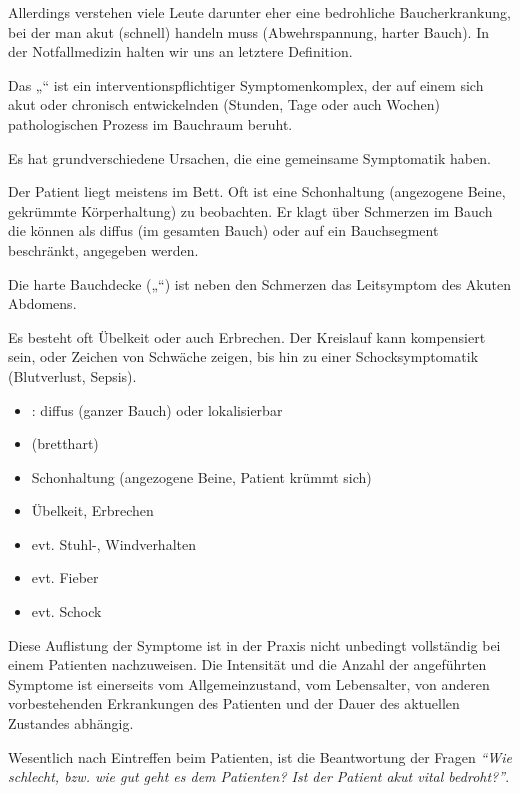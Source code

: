 Allerdings ver\-stehen viele Leute darunter eher
eine bedrohliche Bauch\-erkrankung, bei der man akut (schnell) handeln muss (Ab\-wehrspannung, harter Bauch). In der
Notfallmedizin halten wir uns an letztere Definition. 


{Das „“ ist ein interventionspflichtiger
Symptomenkomplex, der auf einem sich akut oder chronisch
entwickelnden (Stunden, Tage oder auch Wochen) pathologischen
Prozess im Bauchraum beruht.}
{

}{}{}{}

Es hat grundverschiedene Ursachen, die eine gemeinsame
Symptomatik haben.

{
Der Patient liegt meistens im Bett. Oft ist
eine Schonhaltung (angezogene Beine, gekrümmte
Körperhaltung) zu beobachten. Er klagt über Schmerzen im
Bauch die können als diffus (im gesamten Bauch) oder auf ein Bauchsegment
beschränkt, angegeben werden. 

Die harte Bauchdecke („“) ist neben den
Schmerzen das Leitsymptom des Akuten Abdomens. 

Es besteht oft Übelkeit oder auch Erbrechen. Der Kreislauf
kann kompensiert sein, oder Zeichen von Schwäche zeigen,
bis hin zu einer Schocksymptomatik (Blutverlust, Sepsis).
} 
{
\begin{itemize}
  \item {}: diffus (ganzer Bauch) oder
  lokalisierbar
  \item {} (bretthart)
  \item Schonhaltung  (angezogene Beine, Patient
  krümmt sich)
  \item Übelkeit, Erbrechen
  \item evt. Stuhl-, Windverhalten
  \item evt. Fieber
  \item evt. Schock
\end{itemize}
}{}{}{}


Diese Auflistung der Symptome ist in der Praxis nicht
unbedingt vollständig bei einem Patienten nachzuweisen. Die
Intensität und die Anzahl der angeführten Symptome ist
einerseits vom Allgemeinzustand, vom Lebensalter, von
anderen vorbestehenden Erkrankungen des Patienten und der
Dauer des aktuellen Zustandes abhängig.

Wesentlich nach Eintreffen beim Patienten, ist die
Beantwortung der Fragen \emph{"`Wie schlecht, bzw. wie gut
geht es dem Patienten? Ist der Patient akut vital
bedroht?"'}.


